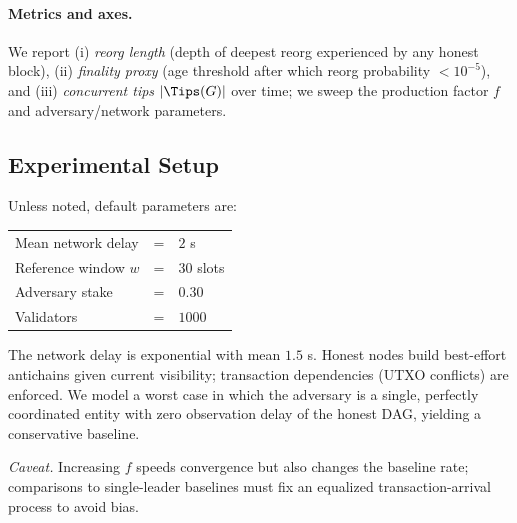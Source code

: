 \paragraph{Metrics and axes.}
We report (i) \emph{reorg length} (depth of deepest reorg experienced by any honest block),
(ii) \emph{finality proxy} (age threshold after which reorg probability $<10^{-5}$),
and (iii) \emph{concurrent tips} $|\Tips(G)|$ over time; we sweep the production factor $f$ and adversary/network parameters.



\subsection{Experimental Setup}\label{sec:setup}
Unless noted, default parameters are:
\begin{center}
\begin{tabular}{lcl}
\toprule
Mean network delay & = & $2$ s\\
Reference window $w$ & = & $30$ slots\\
Adversary stake & = & $0.30$ \\
Validators & = & $1000$ \\
\bottomrule
\end{tabular}
\end{center}

The network delay is exponential with mean $1.5$ s. Honest nodes build best-effort antichains given current visibility; transaction dependencies (UTXO conflicts) are enforced. We model a worst case in which the adversary is a single, perfectly coordinated entity with zero observation delay of the honest DAG, yielding a conservative baseline.


\noindent\emph{Caveat.} Increasing $f$ speeds convergence but also changes the baseline rate; comparisons to single-leader baselines must fix an equalized transaction-arrival process to avoid bias.



